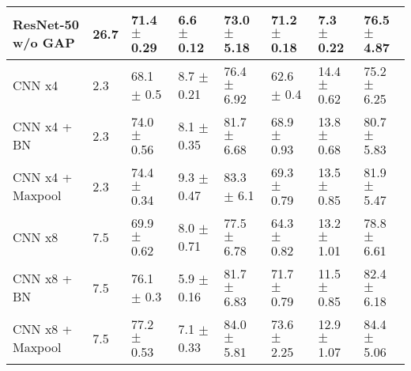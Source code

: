 \begin{table}[h!]
{\begin{tabular}{@{}ll|lll|lll|@{}}
ResNet-50 w/o GAP & 26.7 & 71.4  $\pm$ 0.29 & 6.6  $\pm$ 0.12 & 73.0  $\pm$ 5.18 & 71.2 $\pm$ 0.18 & 7.3 $\pm$ 0.22 & 76.5 $\pm$ 4.87 \\ \midrule
CNN x4 & 2.3 & 68.1  $\pm$ 0.5 & 8.7  $\pm$ 0.21 & 76.4  $\pm$ 6.92 & 62.6 $\pm$ 0.4 & 14.4 $\pm$ 0.62 & 75.2 $\pm$ 6.25 \\
CNN x4 + BN & 2.3 & 74.0  $\pm$ 0.56 & 8.1  $\pm$ 0.35 & 81.7  $\pm$ 6.68 & 68.9 $\pm$ 0.93 & 13.8 $\pm$ 0.68 & 80.7 $\pm$ 5.83 \\
CNN x4 + Maxpool & 2.3 & 74.4  $\pm$ 0.34 & 9.3  $\pm$ 0.47 & 83.3  $\pm$ 6.1 & 69.3 $\pm$ 0.79 & 13.5 $\pm$ 0.85 & 81.9 $\pm$ 5.47 \\ \midrule
CNN x8 & 7.5 & 69.9  $\pm$ 0.62 & 8.0  $\pm$ 0.71 & 77.5  $\pm$ 6.78 & 64.3 $\pm$ 0.82 & 13.2 $\pm$ 1.01 & 78.8 $\pm$ 6.61 \\
CNN x8 + BN & 7.5 & 76.1  $\pm$ 0.3 & 5.9  $\pm$ 0.16 & 81.7  $\pm$ 6.83 & 71.7 $\pm$ 0.79 & 11.5 $\pm$ 0.85 & 82.4 $\pm$ 6.18 \\
CNN x8 + Maxpool & 7.5 & 77.2  $\pm$ 0.53 & 7.1  $\pm$ 0.33 & 84.0  $\pm$ 5.81 & 73.6 $\pm$ 2.25 & 12.9 $\pm$ 1.07 & 84.4 $\pm$ 5.06 \\ \bottomrule
\end{tabular}%
}
\end{table}